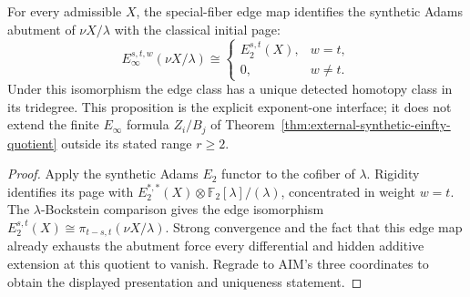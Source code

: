 \begin{proposition}
  \label{prop:synthetic-einfty-first-quotient}
  \notready
  For every admissible $X$, the special-fiber edge map identifies the
  synthetic Adams abutment of $\nu X/\lambda$ with the classical initial page:
  \[
    E_\infty^{s,t,w}(\nu X/\lambda)\cong
    \begin{cases}
      E_2^{s,t}(X),&w=t,\\
      0,&w\ne t.
    \end{cases}
  \]
  Under this isomorphism the edge class has a unique detected homotopy class
  in its tridegree.  This proposition is the explicit exponent-one interface;
  it does not extend the finite $E_\infty$ formula $Z_i/B_j$ of
  Theorem~\ref{thm:external-synthetic-einfty-quotient} outside its stated
  range $r\ge2$.
\end{proposition}

\begin{proof}
  Apply the synthetic Adams $E_2$ functor to the cofiber of $\lambda$.
  Rigidity identifies its page with
  $E_2^{*,*}(X)\otimes\mathbb F_2[\lambda]/(\lambda)$, concentrated in weight
  $w=t$.  The $\lambda$-Bockstein comparison gives the edge isomorphism
  $E_2^{s,t}(X)\cong\pi_{t-s,t}(\nu X/\lambda)$.  Strong convergence and the
  fact that this edge map already exhausts the abutment force every
  differential and hidden additive extension at this quotient to vanish.
  Regrade to AIM's three coordinates to obtain the displayed presentation and
  uniqueness statement.
\end{proof}

